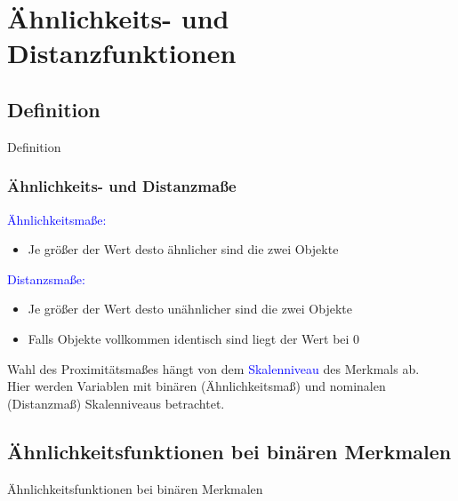 \documentclass{beamer}
\begin{document}
\section{Ähnlichkeits- und Distanzfunktionen}

\subsection{Definition}

\begin{frame}
 \centerline{Definition}
\end{frame}

\begin{frame}
 \frametitle{Ähnlichkeits- und Distanzmaße}

 \textcolor{blue}{Ähnlichkeitsmaße:} \\
 \begin{itemize}
  \item Je größer der Wert desto ähnlicher sind die zwei Objekte
 \end{itemize}

\textcolor{blue}{Distanzsmaße:} \\
 \begin{itemize}
  \item Je größer der Wert desto unähnlicher sind die zwei Objekte
  \item Falls Objekte vollkommen identisch sind liegt der Wert bei 0
 \end{itemize}

 Wahl des Proximitätsmaßes hängt von dem \textcolor{blue}{Skalenniveau} des Merkmals ab. \\
 Hier werden Variablen mit binären (Ähnlichkeitsmaß) und nominalen (Distanzmaß) Skalenniveaus betrachtet. \\



\end{frame}



\subsection{Ähnlichkeitsfunktionen bei binären Merkmalen}

\begin{frame}
 \centerline{Ähnlichkeitsfunktionen bei binären Merkmalen}
\end{frame}
\end{document}
